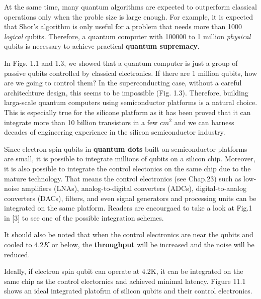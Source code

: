 \documentclass{article}
\begin{document}
At the same time, many quantum algorithms are expected to outperform classical operations
only when the proble size is large enough. For example, it is expected that Shor's 
algorithm is only useful for a problem that needs more than 1000 \textit{logical}
qubits. Therefore, a quantum computer with 100000 to 1 million \textit{physical} qubits
is necessary to achieve practical \textbf{quantum supremacy}.

In Figs. 1.1 and 1.3, we showed that a quantum computer is just a group of
passive qubits controlled by classical electronics. If there are 1 million qubits,
how are we going to control them? In the superconducting case, without a careful architechture
design, this seems to be impossible (Fig. 1.3). Therefore, building larga-scale quantum computers using
semiconductor platforms is a natural choice. This is  especially true for the silicone platform 
as it has been proved that it can integrate more than 10 billion transistors in a few $cm^2$ and we can
harness decades of engineering experience in the silicon semiconductor industry.

Since electron spin qubits in \textbf{quantum dots} built on semiconductor platforms are small, it is
possible to integrate millions of qubits on a silicon chip. Moreover,
it is also possible to integrate the control electonics on the same chip due to
the mature technology. That means the control electronics (see Chap.23) such as low-noise
amplifiers (LNAs), analog-to-digital converters (ADCs), digital-to-analog converters (DACs),
filters, and even signal generators and processing units can be integrated
on the same platform. Readers are encourgaed to take a look at Fig.1 in [3] to see one
of the possible integration schemes.

It should also be noted that when the control electronics are near the qubits and cooled to 4.2$K$ or
below, the \textbf{throughput} will be increased and the noise will be reduced.

Ideally, if electron spin qubit can operate at 4.2K, it can be integrated on the same
chip as the control electornics and achieved minimal latency. Figure 11.1 shows an ideal 
integrated platofrm of silicon qubits and their control electronics.\\
\end{document}
